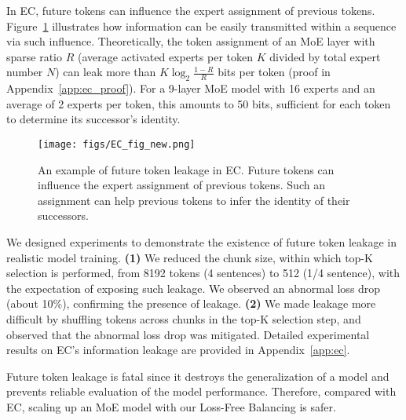 \documentclass{article} %
\newcommand{\ours}{Loss-Free Balancing}
\begin{document}
In EC, future tokens can influence the expert assignment of previous tokens. Figure~\ref{fig:EC_illustration} illustrates how information can be easily transmitted within a sequence via such influence. Theoretically, the token assignment of an MoE layer with sparse ratio $R$ (average activated experts per token $K$ divided by total expert number $N$) can leak more than $K\log_2 \frac{1-R}{R}$ bits per token (proof in Appendix~\ref{app:ec_proof}). For a 9-layer MoE model with 16 experts and an average of 2 experts per token, this amounts to 50 bits, sufficient for each token to determine its successor's identity. 

\begin{figure}[t]
\centering
\texttt{[image: figs/EC\_fig\_new.png]}
% 
\caption{
An example of future token leakage in EC. 
Future tokens can influence the expert assignment of previous tokens. 
Such an assignment can help previous tokens to infer the identity of their successors. 
}
\label{fig:EC_illustration}
\end{figure}

We designed experiments to demonstrate the existence of future token leakage in realistic model training. \textbf{(1)} We reduced the chunk size, within which top-K selection is performed, from 8192 tokens (4 sentences) to 512 (1/4 sentence), with the expectation of exposing such leakage.  We observed an abnormal loss drop (about 10\%), confirming the presence of leakage. \textbf{(2)} We made leakage more difficult by shuffling tokens across chunks in the top-K selection step, and observed that the abnormal loss drop was mitigated. Detailed experimental results on EC's information leakage are provided in Appendix~\ref{app:ec}.

Future token leakage is fatal since it destroys the generalization of a model and prevents reliable evaluation of the model performance.
Therefore, compared with EC, scaling up an MoE model with our \ours{} is safer. 

\end{document}
